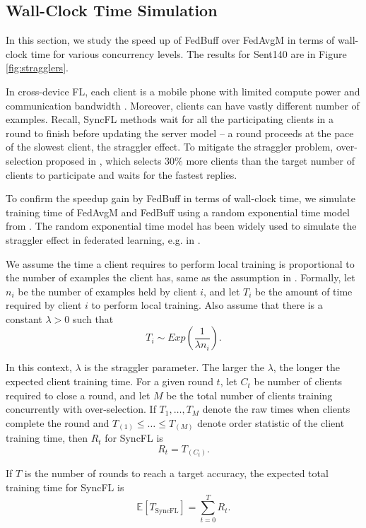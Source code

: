 \documentclass[twoside]{article}
\newcommand{\algname}{{FedBuff}\xspace}
\begin{document}
\subsection{Wall-Clock Time Simulation}
\label{sec:appendix_stragglers}

In this section, we study the speed up of FedBuff over FedAvgM in terms of wall-clock time for various concurrency levels. The results for Sent140 are in Figure \ref{fig:stragglers}. 

In cross-device FL, each client is a mobile phone with limited compute power and communication bandwidth \citep{fl-survey}. Moreover, clients can have vastly different number of examples. Recall, SyncFL methods wait for all the participating clients in a round to finish before updating the server model -- a round proceeds at the pace of the slowest client, the straggler effect. To mitigate the straggler problem, over-selection proposed in \citet{google-fl}, which selects 30\% more clients than the target number of clients to participate and waits for the fastest replies. 

To confirm the speedup gain by \algname in terms of wall-clock time, we simulate training time of FedAvgM and FedBuff using a random exponential time model from \cite{straggler_model}. The random exponential time model has been widely used to simulate the straggler effect in federated learning, e.g. in \cite{reisizadeh2020straggler, tandon2017gradient, yu2020straggler, yu2019lagrange, charles2021large}. 

We assume the time a client requires to perform local training is proportional to the number of examples the client has, same as the assumption in \cite{charles2021large}. Formally, let $n_i$ be the number of examples held by client $i$, and let $T_i$ be the amount of time required by client $i$ to perform local training. Also assume that there is a constant $\lambda > 0$ such that 
\[
T_i \sim Exp( \frac{1}{\lambda n_i}).
\]

In this context, $\lambda$ is the straggler parameter. The larger the $\lambda$, the longer the expected client training time. For a given round $t$, let $C_t$ be number of clients required to close a round, and let $M$ be the total number of clients training concurrently with over-selection. If $T_1, \dots, T_M$ denote the raw times when clients complete the round and $T_{(1)} \le \dots \le T_{(M)}$ denote order statistic of the client training time, then $R_t$ for SyncFL is 
\[
R_t = T_{(C_t)}.
\]

If $T$ is the number of rounds to reach a target accuracy, the expected total training time for SyncFL is
\[
\mathbb{E}[T_{\text{SyncFL}}] = \sum_{t=0}^{T} R_t.
\]
\end{document}
